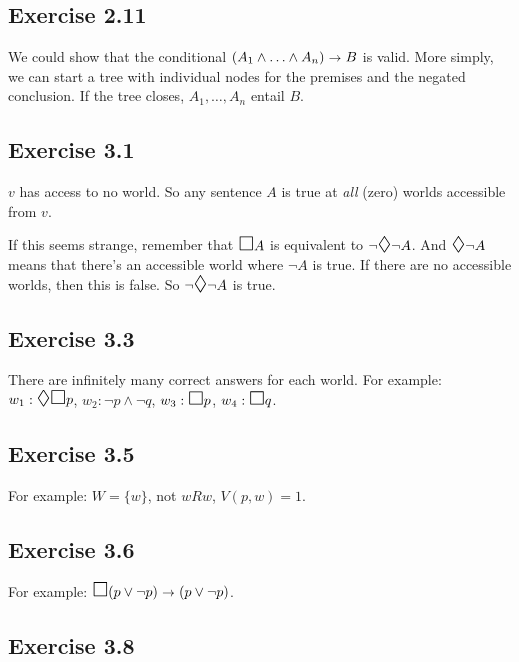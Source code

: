 \documentclass{scrartcl}
\let\oldbox\Box
\renewcommand\Box{\scaleobj{1.2}{\oldbox}}
\let\olddiamond\Diamond
\renewcommand\Diamond{\scaleobj{1.2}{\olddiamond}}
\let\oldto\to
\renewcommand\to{\scaleobj{0.95}{\,\oldto\,}}
\begin{document}
\subsection*{Exercise 2.11}

%
  We could show that the conditional $(A_1\land\ldots\land A_n) \to B$ is
  valid. More simply, we can start a tree with individual nodes for the premises
  and the negated conclusion. If the tree closes, $A_1,\ldots,A_n$ entail $B$.

\subsection*{Exercise 3.1}

  $v$ has access to no world. So any sentence $A$ is true at \emph{all} (zero)
  worlds accessible from $v$.

  If this seems strange, remember that $\Box A$ is equivalent to
  $\neg \Diamond \neg A$. And $\Diamond \neg A$ means that there's an
  accessible world where $\neg A$ is true. If there are no accessible
  worlds, then this is false. So $\neg \Diamond \neg A$ is true.


\subsection*{Exercise 3.3}

  There are infinitely many correct answers for each world. For
  example: $w_1: \Diamond\Box p$, $w_2: \neg p \land \neg q$,
  $w_3: \Box p$, $w_4: \Box q$.

\subsection*{Exercise 3.5}

  For example: $W = \{ w \}$, not $w R w$, $V(p,w) = 1$.

\subsection*{Exercise 3.6}

  For example: $\Box(p \lor \neg p) \to (p \lor \neg p)$.

\subsection*{Exercise 3.8}
\end{document}

